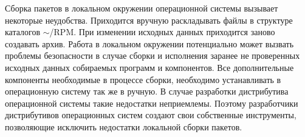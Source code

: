 Сборка пакетов в локальном окружении операционной системы вызывает некоторые неудобства.
Приходится вручную раскладывать файлы в структуре каталогов $\sim$/RPM. При изменении
исходных данных приходится заново создавать архив. Работа в локальном окружении потенциально
может вызвать проблемы безопасности в случае сборки и исполнения заранее не проверенных исходных
данных собираемых программ и компонентов. Все дополнительные компоненты необходимые
в процессе сборки, необходимо устанавливать в операционную систему так же в ручную.
В случае разработки дистрибутива операционной системы такие недостатки неприемлемы.
Поэтому разработчики дистрибутивов операционных систем создают свои собственные инструменты,
позволяющие исключить недостатки локальной сборки пакетов.
